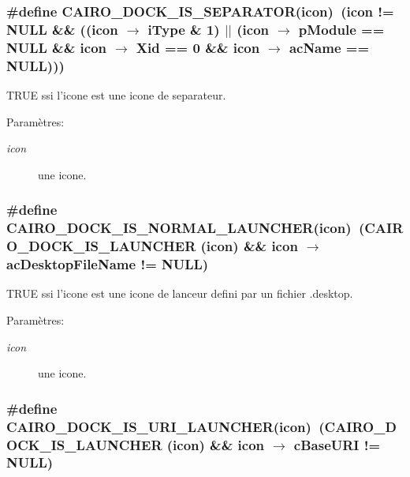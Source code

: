 \subsubsection{\setlength{\rightskip}{0pt plus 5cm}\#define CAIRO\_\-DOCK\_\-IS\_\-SEPARATOR(icon)~(icon != NULL \&\& ((icon $\rightarrow$ iType \& 1) $|$$|$ (icon $\rightarrow$ pModule == NULL \&\& icon $\rightarrow$ Xid == 0 \&\& icon $\rightarrow$ acName == NULL)))}\label{cairo-dock-icons_8h_9d30c0a85b089a0d98a428015d107f86}


TRUE ssi l'icone est une icone de separateur. \begin{Desc}
\item[Paramètres:]
\begin{description}
\item[{\em icon}]une icone. \end{description}
\end{Desc}
\subsubsection{\setlength{\rightskip}{0pt plus 5cm}\#define CAIRO\_\-DOCK\_\-IS\_\-NORMAL\_\-LAUNCHER(icon)~(CAIRO\_\-DOCK\_\-IS\_\-LAUNCHER (icon) \&\& icon $\rightarrow$ acDesktopFileName != NULL)}\label{cairo-dock-icons_8h_f44e2138fd7058738ee48e5aaff1f403}


TRUE ssi l'icone est une icone de lanceur defini par un fichier .desktop. \begin{Desc}
\item[Paramètres:]
\begin{description}
\item[{\em icon}]une icone. \end{description}
\end{Desc}
\subsubsection{\setlength{\rightskip}{0pt plus 5cm}\#define CAIRO\_\-DOCK\_\-IS\_\-URI\_\-LAUNCHER(icon)~(CAIRO\_\-DOCK\_\-IS\_\-LAUNCHER (icon) \&\& icon $\rightarrow$ cBaseURI != NULL)}\label{cairo-dock-icons_8h_14acecf1e96723ddcb10ac01f5bb8174}


